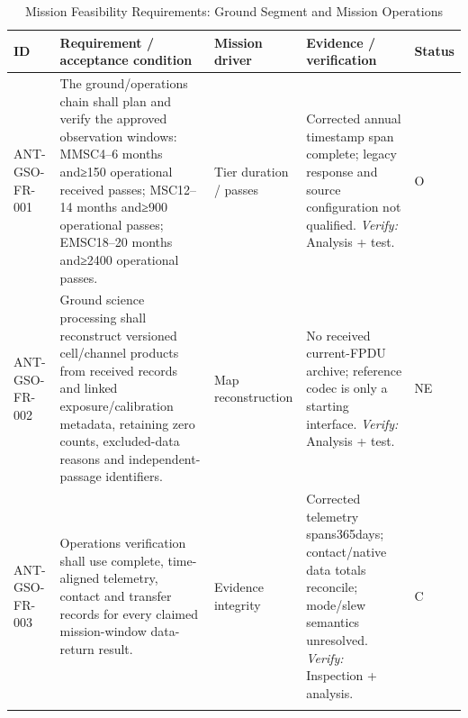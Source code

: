 \begin{table}[H]\centering\small\setlength{\tabcolsep}{3pt}
\caption{Mission Feasibility Requirements: Ground Segment and Mission Operations}\label{tab:fr-gso}
\begin{tabular}{@{}
>{\RaggedRight\arraybackslash}p{}
>{\RaggedRight\arraybackslash}p{}
>{\RaggedRight\arraybackslash}p{}
>{\RaggedRight\arraybackslash}p{}
>{\RaggedRight\arraybackslash}p{}
@{}}
\toprule ID & Requirement / acceptance condition & Mission driver & Evidence / verification & Status\\\midrule
{}\label{req:ANT-GSO-FR-001}\mbox{ANT-GSO-}\newline\mbox{FR-001} & The ground/operations chain shall plan and verify the approved observation windows: MMSC4–6 months and≥150 operational received passes; MSC12–14 months and≥900 operational passes; EMSC18–20 months and≥2400 operational passes. & Tier duration / passes & Corrected annual timestamp span complete; legacy response and source configuration not qualified. \emph{Verify:} Analysis + test. & O\\
\addlinespace[3pt]
\label{req:ANT-GSO-FR-002}\mbox{ANT-GSO-}\newline\mbox{FR-002} & Ground science processing shall reconstruct versioned cell/channel products from received records and linked exposure/calibration metadata, retaining zero counts, excluded-data reasons and independent-passage identifiers. & Map reconstruction & No received current-FPDU archive; reference codec is only a starting interface. \emph{Verify:} Analysis + test. & NE\\
\addlinespace[3pt]
\label{req:ANT-GSO-FR-003}\mbox{ANT-GSO-}\newline\mbox{FR-003} & Operations verification shall use complete, time-aligned telemetry, contact and transfer records for every claimed mission-window data-return result. & Evidence integrity & Corrected telemetry spans365days; contact/native data totals reconcile; mode/slew semantics unresolved. \emph{Verify:} Inspection + analysis. & C\\
\addlinespace[3pt]
\bottomrule
\end{tabular}
\end{table}

